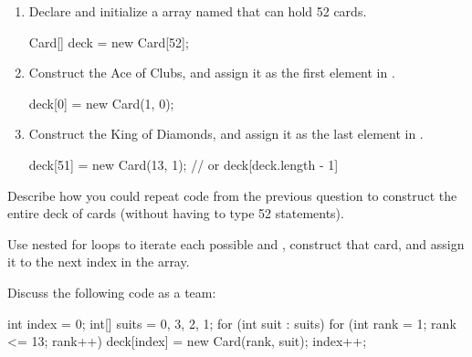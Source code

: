 \begin{enumerate}

\item Declare and initialize a  array named  that can hold 52 cards.
\begin{answer}[1em]
\begin{javaans}
Card[] deck = new Card[52];
\end{javaans}
\end{answer}

\item Construct the Ace of Clubs, and assign it as the first element in .
\begin{answer}[1em]
\begin{javaans}
deck[0] = new Card(1, 0);
\end{javaans}
\end{answer}

\item Construct the King of Diamonds, and assign it as the last element in .
\begin{answer}[1em]
\begin{javaans}
deck[51] = new Card(13, 1);    // or deck[deck.length - 1]
\end{javaans}
\end{answer}

\end{enumerate}


\Q Describe how you could repeat code from the previous question to construct the entire deck of cards (without having to type 52 statements).

\begin{answer}[3em]
Use nested for loops to iterate each possible  and , construct that card, and assign it to the next index in the  array.
\end{answer}


\Q \label{build}
Discuss the following code as a team:

\begin{javalst}
int index = 0;
int[] suits = {0, 3, 2, 1};
for (int suit : suits) {
    for (int rank = 1; rank <= 13; rank++) {
        deck[index] = new Card(rank, suit);
        index++;
    }
}
\end{javalst}

